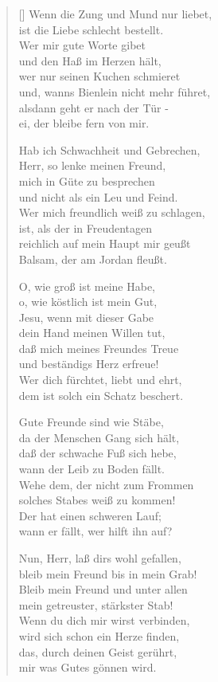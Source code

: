 \begin{multicols}{2}
\begin{verse}[\versewidth]
 Wenn die Zung und Mund nur liebet,\\
ist die Liebe schlecht bestellt.\\
Wer mir gute Worte gibet\\
und den Haß im Herzen hält,\\
wer nur seinen Kuchen schmieret\\
und, wanns Bienlein nicht mehr führet,\\
alsdann geht er nach der Tür -\\
ei, der bleibe fern von mir.

 Hab ich Schwachheit und Gebrechen,\\
Herr, so lenke meinen Freund,\\
mich in Güte zu besprechen\\
und nicht als ein Leu und Feind.\\
Wer mich freundlich weiß zu schlagen,\\
ist, als der in Freudentagen\\
reichlich auf mein Haupt mir geußt\\
Balsam, der am Jordan fleußt.

 O, wie groß ist meine Habe,\\
o, wie köstlich ist mein Gut,\\
Jesu, wenn mit dieser Gabe\\
dein Hand meinen Willen tut,\\
daß mich meines Freundes Treue\\
und beständigs Herz erfreue!\\
Wer dich fürchtet, liebt und ehrt,\\
dem ist solch ein Schatz beschert.

 Gute Freunde sind wie Stäbe,\\
da der Menschen Gang sich hält,\\
daß der schwache Fuß sich hebe,\\
wann der Leib zu Boden fällt.\\
Wehe dem, der nicht zum Frommen\\
solches Stabes weiß zu kommen!\\
Der hat einen schweren Lauf;\\
wann er fällt, wer hilft ihn auf?

 Nun, Herr, laß dirs wohl gefallen,\\
bleib mein Freund bis in mein Grab!\\
Bleib mein Freund und unter allen\\
mein getreuster, stärkster Stab!\\
Wenn du dich mir wirst verbinden,\\
wird sich schon ein Herze finden,\\
das, durch deinen Geist gerührt,\\
mir was Gutes gönnen wird.

\end{verse}
\end{multicols}
